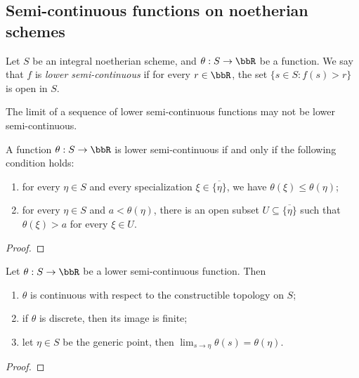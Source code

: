   
\subsection{Semi-continuous functions on noetherian schemes}

  Let $S$ be an integral noetherian scheme, and $\theta: S \to \bbR$ be a function.
  We say that $f$ is \emph{lower semi-continuous} if for every $r \in \bbR$, the set $\{ s \in S : f(s) > r \}$ is open in $S$.

  \begin{remark}
    The limit of a sequence of lower semi-continuous functions may not be lower semi-continuous. 
    \Yang{}
  \end{remark}

  \begin{lemma}\label{lem:characterization_of_lower_semi-continuous_functions_on_noetherian_schemes}
    A function $\theta: S \to \bbR$ is lower semi-continuous if and only if the following condition holds: 
    \begin{enumerate}
      \item for every $\eta \in S$ and every specialization $\xi \in \overline{\{\eta\}}$, we have $\theta(\xi) \leq \theta(\eta)$;
      \item for every $\eta \in S$ and $a < \theta(\eta)$, there is an open subset $U \subseteq \overline{\{\eta\}}$ such that $\theta(\xi) > a$ for every $\xi \in U$.
    \end{enumerate}
  \end{lemma}
  \begin{proof}
    \Yang{}
  \end{proof}


  \begin{lemma}\label{lem:properties_of_lower_semi-continuous_functions_on_noetherian_schemes}
    Let $\theta: S \to \bbR$ be a lower semi-continuous function.
    Then 
    \begin{enumerate}
      \item $\theta$ is continuous with respect to the constructible topology on $S$;
      \item if $\theta$ is discrete, then its image is finite;
      \item let $\eta \in S$ be the generic point, then $\lim_{s \to \eta} \theta(s) = \theta(\eta)$.
    \end{enumerate}
  \end{lemma}
  \begin{proof}
    \Yang{}
  \end{proof}




